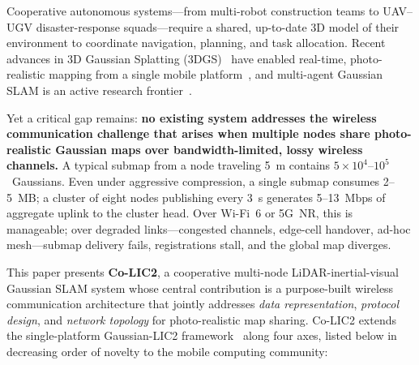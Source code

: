 
Cooperative autonomous systems---from multi-robot construction teams to
UAV--UGV disaster-response squads---require a shared, up-to-date 3D model of
their environment to coordinate navigation, planning, and task allocation.
Recent advances in 3D Gaussian Splatting (3DGS)~\cite{kerbl20233dgs} have
enabled real-time, photo-realistic mapping from a single mobile
platform~\cite{lang2026gaussian2,lang2025gaussian,xie2025gslivm,park2026livegs},
and multi-agent Gaussian SLAM is an active research
frontier~\cite{deambrogi2026cgsslam_mob,thomas2025grandslam_mob,deng2025mneslam}.

Yet a critical gap remains: \textbf{no existing system addresses the wireless
communication challenge that arises when multiple nodes share photo-realistic
Gaussian maps over bandwidth-limited, lossy wireless channels.} A typical
submap from a node traveling 5~m contains $5\times10^4$--$10^5$~Gaussians.
Even under aggressive compression, a single submap consumes 2--5~MB; a cluster
of eight nodes publishing every 3~s generates 5--13~Mbps of aggregate uplink
to the cluster head. Over Wi-Fi~6 or 5G~NR, this is manageable; over degraded
links---congested channels, edge-cell handover, ad-hoc mesh---submap delivery
fails, registrations stall, and the global map diverges.

This paper presents \textbf{Co-LIC2}, a cooperative multi-node
LiDAR-inertial-visual Gaussian SLAM system whose central contribution is a
purpose-built wireless communication architecture that jointly addresses
\emph{data representation}, \emph{protocol design}, and \emph{network topology}
for photo-realistic map sharing. Co-LIC2 extends the single-platform
Gaussian-LIC2 framework~\cite{lang2026gaussian2} along four axes, listed below
in decreasing order of novelty to the mobile computing community:


